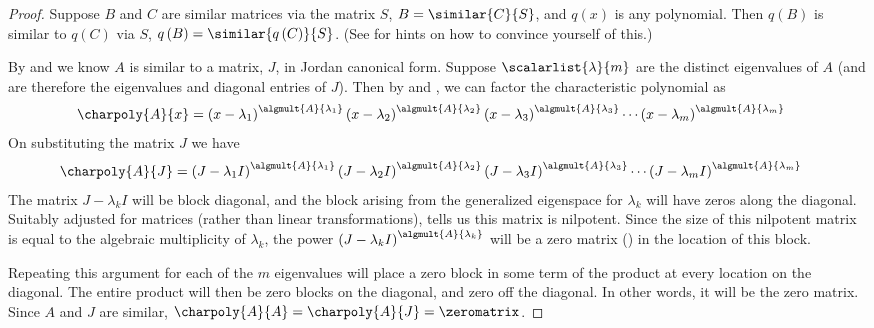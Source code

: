 \begin{proof}
Suppose $B$ and $C$ are similar matrices via the matrix $S$, $B=\similar{C}{S}$, and $q(x)$ is any polynomial.  Then $q\left(B\right)$ is similar to $q\left(C\right)$ via $S$, $q\left(B\right)=\similar{q\left(C\right)}{S}$.  (See  for hints on how to convince yourself of this.)\par
%
By  and  we know $A$ is similar to a matrix, $J$, in Jordan canonical form.  Suppose $\scalarlist{\lambda}{m}$ are the distinct eigenvalues of $A$ (and are therefore the eigenvalues and diagonal entries of $J$).  Then by  and , we can factor the characteristic polynomial as 
%
\begin{align*}
\charpoly{A}{x}&=
\left(x-\lambda_1\right)^{\algmult{A}{\lambda_1}}
\left(x-\lambda_2\right)^{\algmult{A}{\lambda_2}}
\left(x-\lambda_3\right)^{\algmult{A}{\lambda_3}}
\cdots
\left(x-\lambda_m\right)^{\algmult{A}{\lambda_m}}
\end{align*}
%
On substituting the matrix $J$ we have
%
\begin{align*}
\charpoly{A}{J}&=
\left(J-\lambda_1 I\right)^{\algmult{A}{\lambda_1}}
\left(J-\lambda_2 I\right)^{\algmult{A}{\lambda_2}}
\left(J-\lambda_3 I\right)^{\algmult{A}{\lambda_3}}
\cdots
\left(J-\lambda_m I\right)^{\algmult{A}{\lambda_m}}
\end{align*}
%
The matrix $J-\lambda_k I$ will be block diagonal, and the block arising from the generalized eigenspace for $\lambda_k$ will have zeros along the diagonal.  Suitably adjusted for matrices (rather than linear transformations),  tells us this matrix is nilpotent.  Since the size of this nilpotent matrix is equal 
to the algebraic multiplicity of $\lambda_k$, the power $\left(J-\lambda_k I\right)^{\algmult{A}{\lambda_k}}$ will be a zero matrix () in the location of this block.\par
%
Repeating this argument for each of the $m$ eigenvalues will place a zero block in some term of the product at every location on the diagonal.  The entire product will then be zero blocks on the diagonal, and zero off the diagonal.  In other words, it will be the zero matrix.  Since $A$ and $J$ are similar, $\charpoly{A}{A}=\charpoly{A}{J}=\zeromatrix$.
%
\end{proof}
%
%
  
  

